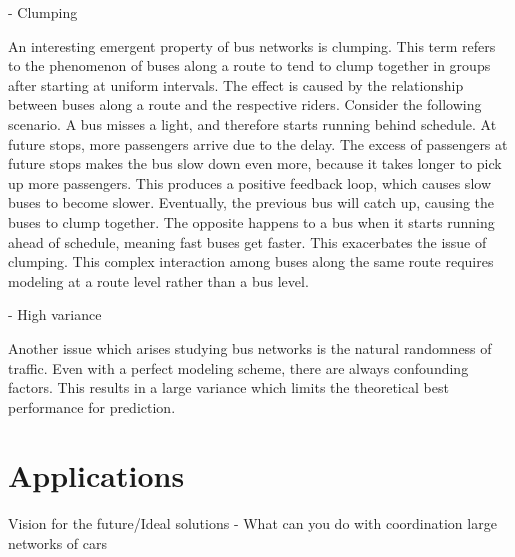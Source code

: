 - Clumping

An interesting emergent property of bus networks is clumping.
This term refers to the phenomenon of buses along a route to tend to clump together in groups after starting at uniform intervals.
The effect is caused by the relationship between buses along a route and the respective riders.
Consider the following scenario.
A bus misses a light, and therefore starts running behind schedule.
At future stops, more passengers arrive due to the delay.
The excess of passengers at future stops makes the bus slow down even more, because it takes longer to pick up more passengers.
This produces a positive feedback loop, which causes slow buses to become slower.
Eventually, the previous bus will catch up, causing the buses to clump together.
The opposite happens to a bus when it starts running ahead of schedule, meaning fast buses get faster.
This exacerbates the issue of clumping.
This complex interaction among buses along the same route requires modeling at a route level rather than a bus level.

- High variance

Another issue which arises studying bus networks is the natural randomness of traffic.
Even with a perfect modeling scheme, there are always confounding factors.
This results in a large variance which limits the theoretical best performance for prediction.

\section{Applications}
Vision for the future/Ideal solutions
- What can you do with coordination large networks of cars

